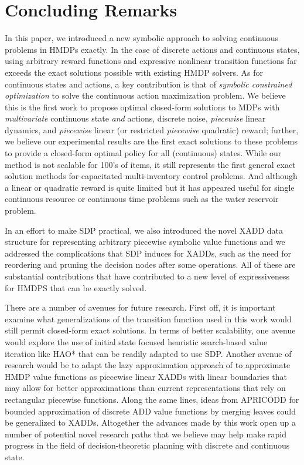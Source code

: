 \documentclass[twoside,11pt]{article}
\begin{document}
\section{Concluding Remarks}

In this paper, we introduced a new symbolic approach to solving continuous problems in HMDPs exactly. In the case of discrete actions and continuous states, using arbitrary
reward functions and expressive nonlinear transition functions far exceeds the exact solutions possible with existing HMDP
solvers.  
As for continuous states and actions, a key contribution is that of \emph{symbolic constrained
optimization} to solve the continuous action maximization problem. We
believe this is the first work to propose optimal closed-form
solutions to MDPs with \emph{multivariate} continuous state \emph{and}
actions, discrete noise, \emph{piecewise} linear dynamics, and
\emph{piecewise} linear (or restricted \emph{piecewise} quadratic)
reward; further, we believe our experimental results are the first
exact solutions to these problems to provide a closed-form optimal
policy for all (continuous) states.
While our method is not scalable for 100's of items, it still represents
the first general exact solution methods for capacitated multi-inventory control problems. 
And although a linear or quadratic reward is quite limited but it has appeared useful for single continuous resource or continuous time problems such as the water reservoir problem. 

In an effort to make SDP practical, we also introduced
the novel XADD data structure for representing arbitrary piecewise
symbolic value functions and we addressed the complications that
SDP induces for XADDs, such as the need for reordering and pruning the decision
nodes after some operations.  All of these are substantial contributions
that have contributed to a new level of expressiveness for HMDPS
that can be exactly solved.

There are a number of avenues for future research.  First off, it is
important examine what generalizations of the transition function used
in this work would still permit closed-form exact solutions.  In terms
of better scalability, one avenue would explore the use of initial
state focused heuristic search-based value iteration like
HAO* \cite{hao09} that can be readily adapted to use SDP.  Another
avenue of research would be to adapt the lazy approximation approach
of \cite{li05} to approximate HMDP value functions as piecewise
linear XADDs with linear boundaries that may allow for better
approximations than current representations that rely on rectangular
piecewise functions.  Along the same lines, ideas from
APRICODD \cite{apricodd} for bounded approximation of discrete ADD
value functions by merging leaves could be generalized to XADDs.
Altogether the advances made by this work open up a number of
potential novel research paths that we believe may help make
rapid progress in the field of decision-theoretic planning
with discrete and continuous state.
\end{document}
